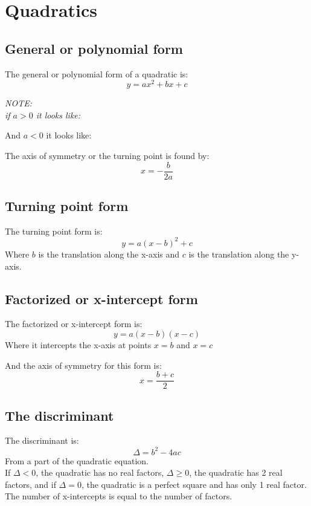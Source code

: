 \documentclass{book}
\newenvironment{note}{\begin{center}\em NOTE:\\}{\end{center}}
\begin{document}
\chapter{Quadratics}
\section{General or polynomial form}
The general or polynomial form of a quadratic is:
\[
	y = ax^2 + bx + c
\]
\begin{note}
	if $a > 0$ it looks like:
	\begin{center}
	\end{center}
	And $a < 0$ it looks like:
	\begin{center}
	\end{center}
\end{note}
The axis of symmetry or the turning point is found by:
\[
	x = -\frac{b}{2a}
\]

\section{Turning point form}
The turning point form is:
\[
	y = a(x - b)^2 + c
\]
Where $b$ is the translation along the x-axis and $c$ is the translation along the y-axis.

\section{Factorized or x-intercept form}
The factorized or x-intercept form is:
\[
	y = a(x - b)(x - c)
\]
Where it intercepts the x-axis at points $x = b$ and $x = c$

And the axis of symmetry for this form is:
\[
	x = \frac{b + c}{2}
\]

\section{The discriminant}
The discriminant is:
\[
	\Delta = b^2 - 4ac
\]
From a part of the quadratic equation.\\
If $\Delta < 0$, the quadratic has no real factors, $\Delta \geq 0$, the quadratic has 2 real factors, and if $\Delta = 0$, the quadratic is a perfect square and has only 1 real factor.  The number of x-intercepts is equal to the number of factors.
\end{document}

